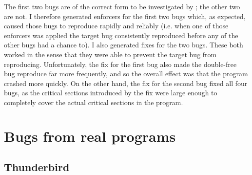 
The first two bugs are of the correct form to be investigated by
{\technique}; the other two are not.  I therefore generated enforcers
for the first two bugs which, as expected, caused those bugs to
reproduce rapidly and reliably (i.e. when one of those enforcers was
applied the target bug consistently reproduced before any of the other
bugs had a chance to).  I also generated fixes for the two bugs.
These both worked in the sense that they were able to prevent the
target bug from reproducing.  Unfortunately, the fix for the first bug
also made the double-free bug reproduce far more frequently, and so
the overall effect was that the program crashed more quickly.  On the
other hand, the fix for the second bug fixed all four bugs, as the
critical sections introduced by the fix were large enough to
completely cover the actual critical sections in the program.



\section{Bugs from real programs}
\label{sect:eval:real}

\subsection{Thunderbird}

